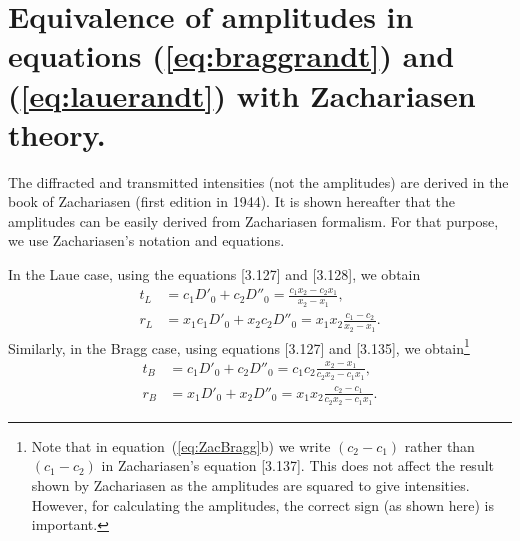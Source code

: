 \documentclass{iucr}
\begin{document}
\section{Equivalence of amplitudes in equations (\ref{eq:braggrandt}) and (\ref{eq:lauerandt}) with Zachariasen theory.}
\label{appendix:zachariasen}

The diffracted and transmitted intensities (not the amplitudes) are derived in the book of Zachariasen \cite{ZachariasenBook} (first edition in 1944). It is shown hereafter that the amplitudes can be easily derived from Zachariasen formalism. For that purpose, we use Zachariasen's notation and equations. 

In the Laue case, using the equations [3.127] and [3.128], we obtain
 	\begin{subequations}
    \label{eq:ZacLaue}
    \begin{align}
    t_L &= c_1 D'_0 + c_2 D''_0 = \frac{c_1 x_2 - c_2 x_1}{x_2-x_1},\\
    r_L &= x_1 c_1 D'_0 + x_2 c_2 D''_0 = x_1 x_2 \frac{c_1 - c_2}{x_2-x_1}.
    \end{align}
	\end{subequations}
Similarly, in the Bragg case, using equations [3.127] and [3.135], we obtain\footnote{Note that in equation~(\ref{eq:ZacBragg}b) we write $(c_2-c_1)$ rather than $(c_1-c_2)$ in Zachariasen's equation [3.137]. This does not affect the result shown by Zachariasen as the amplitudes are squared to give intensities. However, for calculating the amplitudes, the correct sign (as shown here) is important.}
 	\begin{subequations}
    \label{eq:ZacBragg}
    \begin{align}
    t_B &= c_1 D'_0 + c_2 D''_0 = c_1 c_2 \frac{x_2 - x_1}{c_2 x_2-c_1 x_1},\\
    r_B &= x_1 D'_0 + x_2 D''_0 = x_1 x_2 \frac{c_2 - c_1}{c_2 x_2-c_1 x_1}.
    \end{align}
	\end{subequations}


\end{document}
